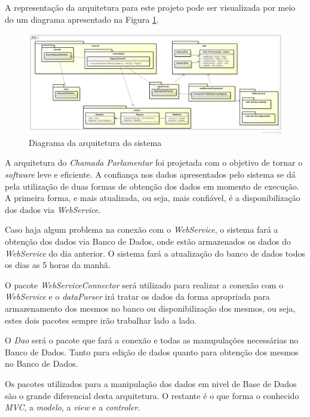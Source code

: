 A representação da arquitetura para este projeto pode ser visualizada por meio do um diagrama apresentado na Figura \ref{img:diagrama_arquitetura}.

\begin{figure}[H]
	\centering
	\includegraphics[width=1\textwidth]{arquitetura/arquitetura_sprint1}
	\caption{Diagrama da arquitetura do sistema}
	\label{img:diagrama_arquitetura}
\end{figure}

A arquitetura do \textit{Chamada Parlamentar} foi projetada com o objetivo de tornar o \textit{software} leve e eficiente. A confiança nos dados apresentados pelo sistema se dá pela utilização de duas formas de obtenção dos dados em momento de execução. A primeira forma, e mais atualizada, ou seja, mais confiável, é a disponibilização dos dados via \textit{WebService}.

Caso haja algum problema na conexão com o \textit{WebService}, o sistema fará a obtenção dos dados via Banco de Dados, onde estão armazenados os dados do \textit{WebService} do dia anterior. O sistema fará a atualização do banco de dados todos os dias as 5 horas da manhã.

O pacote \textit{WebServiceConnector} será utilizado para realizar a conexão com o \textit{WebService} e o \textit{dataParser} irá tratar os dados da forma apropriada para armazenamento dos mesmos no banco ou disponibilização dos mesmos, ou seja, estes dois pacotes sempre irão trabalhar lado a lado.

O \textit{Dao} será o pacote que fará a conexão e todas as manupulações necessárias no Banco de Dados. Tanto para edição de dados quanto para obtenção dos mesmos no Banco de Dados.

Os pacotes utilizados para a manipulação dos dados em nivel de Base de Dados são o grande diferencial desta arquitetura. O restante é o que forma o conhecido \textit{MVC}, a \textit{modelo}, a \textit{view} e a \textit{controler}.